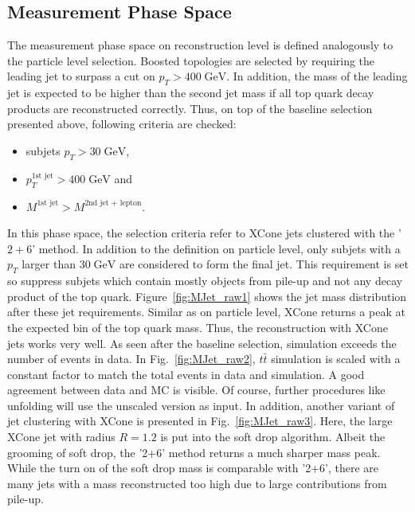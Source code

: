 \subsection{Measurement Phase Space}
\label{sec:FinalSel}
	The measurement phase space on reconstruction level is defined analogously to the particle level selection. Boosted topologies are selected by requiring the leading jet to surpass a cut on $p_T > 400\;\text{GeV}$. In addition, the mass of the leading jet is expected to be higher than the second jet mass if all top quark decay products are reconstructed correctly. Thus, on top of the baseline selection presented above, following criteria are checked:
	\begin{itemize}
	\item subjets $p_T > 30\;\text{GeV}$,
	\item $p_T^{\text{1st jet}} > 400\;\text{GeV}$ and
	\item $M^{\text{1st jet}} > M^{\text{2nd jet + lepton}}$.
	\end{itemize}
	In this phase space, the selection criteria refer to XCone jets clustered with the '$2+6$' method.	In addition to the definition on particle level, only subjets with a $p_T$ larger than $30\;\text{GeV}$ are considered to form the final jet. This requirement is set so suppress subjets which contain mostly objects from pile-up and not any decay product of the top quark. Figure~\ref{fig:MJet_raw1} shows the jet mass distribution after these jet requirements. Similar as on particle level, XCone returns a peak at the expected bin of the top quark mass. Thus, the reconstruction with XCone jets works very well. As seen after the baseline selection, simulation exceeds the number of events in data. In Fig.~\ref{fig:MJet_raw2}, $t\bar{t}$ simulation is scaled with a constant factor to match the total events in data and simulation. A good agreement between data and MC is visible. Of course, further procedures like unfolding will use the unscaled version as input. In addition, another variant of jet clustering with XCone is presented in Fig.~\ref{fig:MJet_raw3}. Here, the large XCone jet with radius $R=1.2$ is put into the soft drop algorithm. Albeit the grooming of soft drop, the '2+6' method returns a much sharper mass peak. While the turn on of the soft drop mass is comparable with '2+6', there are many jets with a mass reconstructed too high due to large contributions from pile-up.
